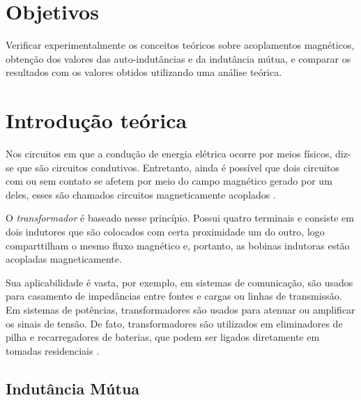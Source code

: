 \documentclass[a4paper,12pt,oneside,openany,table,xcdraw]{article}
\begin{document}
\newcommand{\thedepartment}{Faculdade de Engenharia Elétrica}
\newcommand{\thecourse}{FEELT}
\newcommand{\thetitle}{CIRCUITOS ACOPLADOS MAGNETICAMENTE}
\newcommand{\thetype}{Relatório da Disciplina de Circuitos Elétricos II}
\newcommand{\theproftitle}{Bacharel em Engenharia Elétrica}
\newcommand{\thestudent}{Lesly Viviane Montúfar Berrios\\
\centering11811ETE001}
\newcommand{\theadvisor}{Prof. Wellington Maycon Santos Bernardes}
\newcommand{\thecity}{Uberlândia}

\thispagestyle{empty}


\onehalfspacing
\tableofcontents %
\newpage

\section{Objetivos} %
Verificar experimentalmente os conceitos teóricos sobre acoplamentos magnéticos,
obtenção dos valores das auto-indutâncias e da indutância mútua, e comparar os resultados
com os valores obtidos utilizando uma análise teórica.

\section{Introdução teórica} %
Nos circuitos em que a condução de energia elétrica ocorre por meios físicos, diz-se que são circuitos condutivos. Entretanto, ainda é possível que dois circuitos com ou sem contato se afetem por meio do campo magnético gerado por um deles, esses são chamados circuitos magneticamente acoplados \cite{ph}.

O \emph{transformador} é baseado nesse princípio. Possui quatro terminais e consiste em dois indutores que são colocados com certa proximidade um do outro, logo comparttilham o mesmo fluxo magnético e, portanto, as bobinas indutoras estão acopladas magneticamente. 

Sua aplicabilidade é vasta, por exemplo, em sistemas de comunicação, são usados para casamento de impedâncias entre fontes e cargas ou linhas de transmissão. Em sistemas de potências, transformadores são usados para atenuar ou amplificar os sinais de tensão. De fato, transformadores são utilizados em eliminadores de pilha e recarregadores de baterias, que podem ser ligados diretamente em tomadas residenciais \cite{irwin}.

\subsection{Indutância Mútua}
\end{document}
